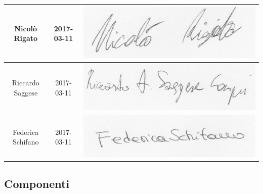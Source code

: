 \begin{center}
\begin{tabular}{|c|c|c|}
		\hline Nicolò Rigato & 2017-03-11 & 
    \begin{minipage}{.3\textwidth}
      \includegraphics[width=\linewidth]{../../../file_comuni/firme/nr.jpg}
    \end{minipage} \\
		\hline Riccardo Saggese & 2017-03-11 &      
\begin{minipage}{.3\textwidth}
      \includegraphics[width=\linewidth]{../../../file_comuni/firme/rs.jpg}
    \end{minipage}
\\
		\hline Federica Schifano & 2017-03-11 & 
    \begin{minipage}{.3\textwidth}
      \includegraphics[width=\linewidth]{../../../file_comuni/firme/fs.jpg}
    \end{minipage}
 \\\hline
	\end{tabular}
	
\end{center}
\clearpage
\subsection{Componenti}

